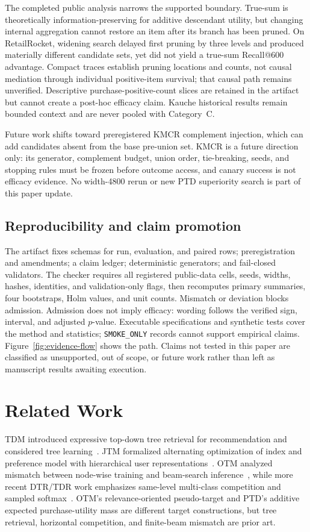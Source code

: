 \documentclass[sigconf,natbib=true]{acmart}
\begin{document}
The completed public analysis narrows the supported boundary. True-sum is theoretically information-preserving for additive descendant utility, but changing internal aggregation cannot restore an item after its branch has been pruned. On RetailRocket, widening search delayed first pruning by three levels and produced materially different candidate sets, yet did not yield a true-sum Recall@600 advantage. Compact traces establish pruning locations and counts, not causal mediation through individual positive-item survival; that causal path remains unverified. Descriptive purchase-positive-count slices are retained in the artifact but cannot create a post-hoc efficacy claim. Kauche historical results remain bounded context and are never pooled with Category~C.

Future work shifts toward preregistered KMCR complement injection, which can add candidates absent from the base pre-union set. KMCR is a future direction only: its generator, complement budget, union order, tie-breaking, seeds, and stopping rules must be frozen before outcome access, and canary success is not efficacy evidence. No width-4800 rerun or new PTD superiority search is part of this paper update.

\subsection{Reproducibility and claim promotion}
The artifact fixes schemas for run, evaluation, and paired rows; preregistration and amendments; a claim ledger; deterministic generators; and fail-closed validators. The checker requires all registered public-data cells, seeds, widths, hashes, identities, and validation-only flags, then recomputes primary summaries, four bootstraps, Holm values, and unit counts. Mismatch or deviation blocks admission. Admission does not imply efficacy: wording follows the verified sign, interval, and adjusted $p$-value. Executable specifications and synthetic tests cover the method and statistics; \texttt{SMOKE\_ONLY} records cannot support empirical claims. Figure~\ref{fig:evidence-flow} shows the path. Claims not tested in this paper are classified as unsupported, out of scope, or future work rather than left as manuscript results awaiting execution.




\section{Related Work}
TDM introduced expressive top-down tree retrieval for recommendation and considered tree learning~\citep{zhu2018tdm}. JTM formalized alternating optimization of index and preference model with hierarchical user representations~\citep{zhu2019jtm}. OTM analyzed mismatch between node-wise training and beam-search inference~\citep{zhuo2020otm}, while more recent DTR/TDR work emphasizes same-level multi-class competition and sampled softmax~\citep{liu2024dtr}. OTM's relevance-oriented pseudo-target and PTD's additive expected purchase-utility mass are different target constructions, but tree retrieval, horizontal competition, and finite-beam mismatch are prior art.
\end{document}
